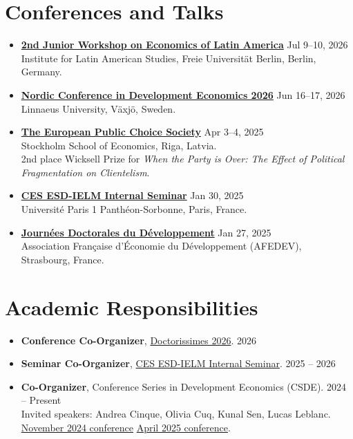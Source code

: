 \documentclass[10pt,a4paper]{article}
\begin{document}
\section{Conferences and Talks}
\begin{itemize}
\item \textbf{\href{https://www.lai.fu-berlin.de/disziplinen/oekonomie/news/Call-for-Papers---2nd-Junior-Workshop-on-Economics-of-Latin-America.html}{2nd Junior Workshop on Economics of Latin America}} \hfill Jul 9--10, 2026\\
Institute for Latin American Studies, Freie Universität Berlin, Berlin, Germany.
\item \textbf{\href{https://lnu.se/en/meet-linnaeus-university/current/events/2026/conferences/ncde-2026/}{Nordic Conference in Development Economics 2026}} \hfill Jun 16--17, 2026\\
Linnaeus University, Växjö, Sweden.
\item \textbf{\href{https://carolinaarboledalenis.github.io/talks/2013-03-01-tutorial-1}{The European Public Choice Society}} \hfill Apr 3--4, 2025\\
Stockholm School of Economics, Riga, Latvia.\\
2nd place Wicksell Prize for \emph{When the Party is Over: The Effect of Political Fragmentation on Clientelism}.
\item \textbf{\href{https://internalsem.wordpress.com/}{CES ESD-IELM Internal Seminar}} \hfill Jan 30, 2025\\
Université Paris 1 Panthéon-Sorbonne, Paris, France.
\item \textbf{\href{https://carolinaarboledalenis.github.io/talks/2012-03-01-talk-1}{Journées Doctorales du Développement}} \hfill Jan 27, 2025\\
Association Française d'Économie du Développement (AFEDEV), Strasbourg, France.
\end{itemize}

\section{Academic Responsibilities}
\begin{itemize}
\item \textbf{Conference Co-Organizer}, \href{https://ces.pantheonsorbonne.fr/en/evenements/doctorissimes-2025}{Doctorissimes 2026}. \hfill 2026
\item \textbf{Seminar Co-Organizer}, \href{https://internalsem.wordpress.com/}{CES ESD-IELM Internal Seminar}. \hfill 2025 -- 2026
\item \textbf{Co-Organizer}, Conference Series in Development Economics (CSDE). \hfill 2024 -- Present\\
Invited speakers: Andrea Cinque, Olivia Cuq, Kunal Sen, Lucas Leblanc.\\
\href{https://economie-master-developmenteconomics.pantheonsorbonne.fr/actualite/conference-series-development-economics-csde-first-conference-21-november}{November 2024 conference}\quad\textbar\quad
\href{https://economie-master-developmenteconomics.pantheonsorbonne.fr/actualite/table-ronde-30-avril-2025-lavenir-marches-travail-et-developpement-inclusif}{April 2025 conference}.
\end{itemize}
\end{document}
